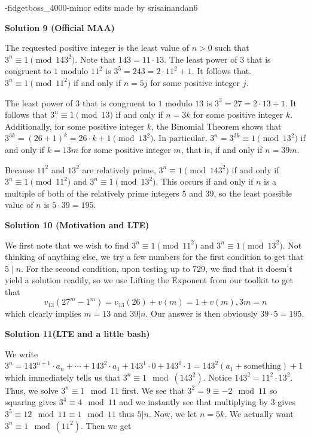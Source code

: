 \begin{enumerate}
 -fidgetboss\_4000-minor edits made by srisainandan6

 



\textbf{Solution 9 (Official MAA)}

The requested positive integer is the least value of $n>0$ such that $3^n\equiv 1\pmod{143^2}.$ Note that $143=11\cdot 13.$ The least power of $3$ that is congruent to $1$ modulo $11^2$ is $3^5=243=2\cdot 11^2+1.$ It follows that. $3^n\equiv 1\pmod {11^2}$ if and only if $n=5j$ for some positive integer $j$.

 The least power of $3$ that is congruent to $1$ modulo $13$ is $3^3=27=2\cdot 13+1.$ It follows that $3^n\equiv 1\pmod{13}$ if and only if $n=3k$ for some positive integer $k$. Additionally, for some positive integer $k$, the Binomial Theorem shows that $3^{3k}=(26+1)^k=26\cdot k+1 \pmod{13^2}$. In particular, $3^n=3^{3k}\equiv 1\pmod {13^2}$ if and only if $k=13m$ for some positive integer $m$, that is, if and only if $n=39m.$

 Because $11^2$ and $13^2$ are relatively prime, $3^n\equiv 1\pmod {143^2}$ if and only if $3^n\equiv 1\pmod{11^2}$ and $3^n \equiv 1\pmod {13^2}$. This occurs if and only if $n$ is a multiple of both of the relatively prime integers $5$ and $39$, so the least possible value of $n$ is $5\cdot 39=\boxed{195}.$




\textbf{Solution 10 (Motivation and LTE)}

We first note that we wish to find $3^n \equiv 1 \pmod{11^2}$ and $3^n \equiv 1 \pmod{13^2}.$ Not thinking of anything else, we try a few numbers for the first condition to get that $5 \mid n.$ For the second condition, upon testing up to 729, we find that it doesn't yield a solution readily, so we use Lifting the Exponent from our toolkit to get that 
 \[v_{13}(27^m-1^m)=v_{13}(26)+v(m)=1+v(m), 3m = n\] which clearly implies $m=13$ and $39 | n.$ Our answer is then obviously $39 \cdot 5 = \boxed{195}.$




\textbf{Solution 11(LTE and a little bash)}

We write $3^n = 143^{n + 1} \cdot a_n + \cdots + 143^2 \cdot a_1 + 143^1 \cdot 0 + 143^0 \cdot 1 = 143^2(a_1 + \text{something}) + 1$ which immediately tells us that $3^n \equiv 1 \mod (143^2)$. Notice $143^2 = 11^2 \cdot 13^2$. Thus, we solve $3^n \equiv 1 \mod 11$ first. We see that $3^2 = 9 \equiv -2 \mod 11$ so squaring gives $3^4 \equiv 4 \mod 11$ and we instantly see that multiplying by $3$ gives $3^5 \equiv 12 \mod 11 \equiv 1 \mod 11$ thus $5 | n$. Now, we let $n = 5k$. We actually want $3^n \equiv 1 \mod (11^2)$. Then we get


\end{enumerate}
